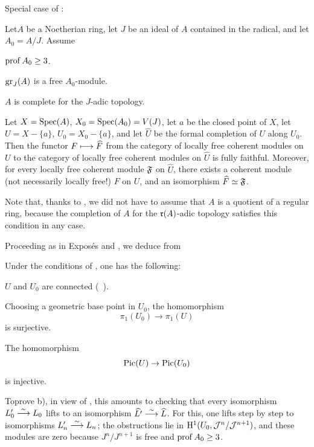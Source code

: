 \pagebreak[2]
Special case of :

\begin{corollaire} \label{XII.4.5}
Let\pageoriginaled $A$ be a Noetherian ring, let $J$ be an ideal of $A$ contained in the radical, and let $A_0=A/J$. Assume
\begin{enumeratei}
\item
$\operatorname{prof} A_0\geq 3$.
\item
$\operatorname{gr}_J(A)$ is a free $A_0$-module.
\item
$A$ is complete for the $J$-adic topology.
\end{enumeratei}

Let $X=\operatorname{Spec}(A)$, $X_0=\operatorname{Spec}(A_0)=V(J)$, let $a$ be the closed point of $X$, let $U=X-\{a\}$, $U_0=X_0-\{a\}$, and let $\widehat{U}$ be the formal completion of $U$ along $U_0$. Then the functor $F\longmapsto \widehat{F}$ from the category of locally free coherent modules on $U$ to the category of locally free coherent modules on $\widehat{U}$ is fully faithful. Moreover, for every locally free coherent module $\mathfrak F$ on $\widehat{U}$, there exists a coherent module (not necessarily locally free!) $F$ on $U$, and an isomorphism $\widehat{F}\simeq\mathfrak F$.
\end{corollaire}

Note that, thanks to , we did not have to assume that $A$ is a quotient of a regular ring, because the completion of $A$ for the $\mathfrak{r}(A)$-adic topology satisfies this condition in any case.

Proceeding as in Expos\'es  and , we deduce from 

\begin{corollaire} \label{XII.4.6}
Under the conditions of , one has the following:
\begin{enumeratea}
\item
$U$ and $U_0$ are connected (~).

Choosing a geometric base point in $U_0$, the homomorphism
\[
\pi_1(U_0)\to \pi_1(U)
\]
is surjective.
\item
The homomorphism
\[
\operatorname{Pic}(U)\to \operatorname{Pic}(U_0)
\]
is injective.
\end{enumeratea}
\end{corollaire}

To\pageoriginale prove b), in view of , this amounts to checking that every isomorphism $L_0'\overset{\sim}{\longrightarrow} L_0$ lifts to an isomorphism $\widehat{L'}\overset{\sim}{\longrightarrow} \widehat{L}$. For this, one lifts step by step to isomorphisms $L_n'\overset{\sim}{\longrightarrow} L_n$; the obstructions lie in $\mathrm H^1(U_0, \mathcal J^n/\mathcal J^{n+1})$, and these modules are zero because $J^n/J^{n+1}$ is free and $\operatorname{prof} A_0\geq 3$.

